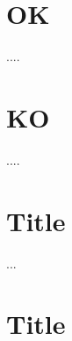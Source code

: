 \documentclass{scrbook}
\begin{document}
\frontmatter


\tableofcontents

\mainmatter

\chapter{OK}
....

\chapter{KO}
....

\appendix

\chapter{Title}

...

\chapter{Title}
\end{document}
